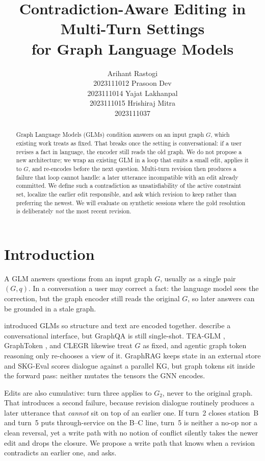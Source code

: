 \documentclass[11pt]{article}
\title{Contradiction-Aware Editing in Multi-Turn Settings\\for Graph Language Models}
\author{
Arihant Rastogi \\ 2023111012 \And
Prasoon Dev \\ 2023111014 \And
Yajat Lakhanpal \\ 2023111015 \And
Hrishiraj Mitra \\ 2023111037
}
\date{}
\begin{document}
\maketitle

\begin{abstract}
Graph Language Models (GLMs) condition answers on an input graph $G$, which
existing work treats as fixed. That breaks once the setting is conversational: if
a user revises a fact in language, the encoder still reads the old graph. We do
not propose a new architecture; we wrap an existing GLM in a loop that emits a
small edit, applies it to $G$, and re-encodes before the next question. Multi-turn
revision then produces a failure that loop cannot handle: a later utterance
incompatible with an edit already committed. We define such a contradiction as
unsatisfiability of the active constraint set, localize the earlier edit
responsible, and ask which revision to keep rather than preferring the newest. We
will evaluate on synthetic sessions where the gold resolution is deliberately
\emph{not} the most recent revision.
\end{abstract}

\section{Introduction}

A GLM answers questions from an input graph $G$, usually as a single pair
$(G, q)$. In a conversation a user may correct a fact: the language model sees
the correction, but the graph encoder still reads the original $G$, so later
answers can be grounded in a stale graph.

\citet{plenz-frank-2024-graph} introduced GLMs so structure and text are encoded
together. \citet{he-2024-gretriever} describe a conversational interface, but
GraphQA is still single-shot. TEA-GLM \citep{wang-2024-teaglm}, GraphToken
\citep{perozzi-2024-graphtoken}, and CLEGR \citep{petkar-2026-clegr} likewise
treat $G$ as fixed, and agentic graph token reasoning
\citep{peng-yang-2026-agentic} only re-chooses a view of it. GraphRAG keeps state
in an external store and SKG-Eval \citep{shil-samui-2026-skgeval} scores dialogue
against a parallel KG, but graph tokens sit inside the forward pass: neither
mutates the tensors the GNN encodes.

Edits are also cumulative: turn three applies to $G_2$, never to the original
graph. That introduces a second failure, because revision dialogue routinely
produces a later utterance that \emph{cannot} sit on top of an earlier one. If
turn~2 closes station~B and turn~5 puts through-service on the B--C line, turn~5
is neither a no-op nor a clean reversal, yet a write path with no notion of
conflict silently takes the newer edit and drops the closure. We propose a write
path that knows when a revision contradicts an earlier one, and asks.
\end{document}
